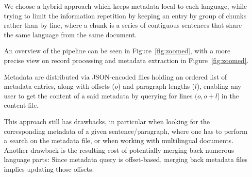 We choose a hybrid approach which keeps metadata local to each language, while trying to limit the information repetition by keeping an entry by group of chunks rather than by line, where a chunk is a series of contiguous sentences that share the same language from the same document.

An overview of the pipeline can be seen in Figure~\ref{fig:zoomed}, with a more precise view on record processing and metadata extraction in Figure~\ref{fig:zoomed}.

Metadata are distributed via JSON-encoded files holding an ordered list of metadata entries, along with offsets ($o$) and paragraph lengths ($l$), enabling any user to get the content of a said metadata by querying for lines $(o, o+l]$ in the content file.

This approach still has drawbacks, in particular when looking for the corresponding metadata of a given sentence/paragraph, where one has to perform a search on the metadata file, or when working with multilingual documents. Another drawback is the resulting cost of potentially merging back numerous language parts: Since metadata query is offset-based, merging back metadata files implies updating those offsets.


